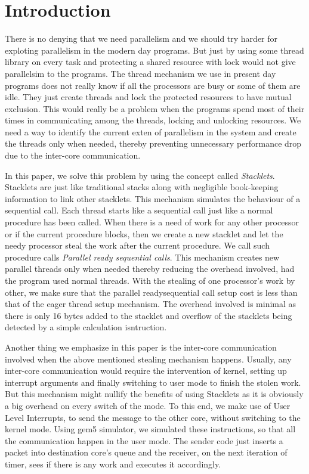 \section{Introduction}

There is no denying that we need parallelism and we should try harder for 
exploting parallelism in the modern day programs. But just by using some
thread library on every task and protecting a shared resource with lock
would not give parallelsim to the programs. The thread mechanism we use in
present day programs does not really know if all the processors are busy or
some of them are idle. They just create threads and lock the protected
resources to have mutual exclusion. This would really be a problem when the
programs spend most of their times in communicating among the threads, locking
and unlocking resources. We need a way to identify the current exten of 
parallelism in the system and create the threads only when needed, thereby
preventing unnecessary performance drop due to the inter-core communication.

In this paper, we solve this problem by using the concept called \textit{Stacklets}.
Stacklets are just like traditional stacks along with negligible book-keeping
information to link other stacklets. This mechanism simulates the behaviour of
a sequential call. Each thread starts like a sequential call just like a normal
procedure has been called. When there is a need of work for any other processor
or if the current procedure blocks, then we create a new stacklet and let the
needy processor steal the work after the current procedure. We call such
procedure calls \textit{Parallel ready sequential calls}. This mechanism
creates new parallel threads only when needed thereby reducing the overhead
involved, had the program used normal threads. With the stealing of one
processor's work by other, we make sure that the parallel readysequential call
setup cost is less than that of the eager thread setup mechanism. The overhead
involved is minimal as there is only 16 bytes added to the stacklet and
overflow of the stacklets being detected by a simple calculation isntruction.

Another thing we emphasize in this paper is the inter-core communication
involved when the above mentioned stealing mechanism happens. Usually, any
inter-core communication would require the intervention of kernel, setting up
interrupt arguments and finally switching to user mode to finish the stolen
work. But this mechanism might nullify the benefits of using Stacklets as it
is obviously a big overhead on every switch of the mode. To this end, we make
use of User Level Interrupts, to send the message to the other core, without
switching to the kernel mode. Using gem5 simulator, we simulated these
instructions, so that all the communication happen in the user mode. The sender
code just inserts a packet into destination core's queue and the receiver,
on the next iteration of timer, sees if there is any work and executes it
accordingly.

\lipsum
